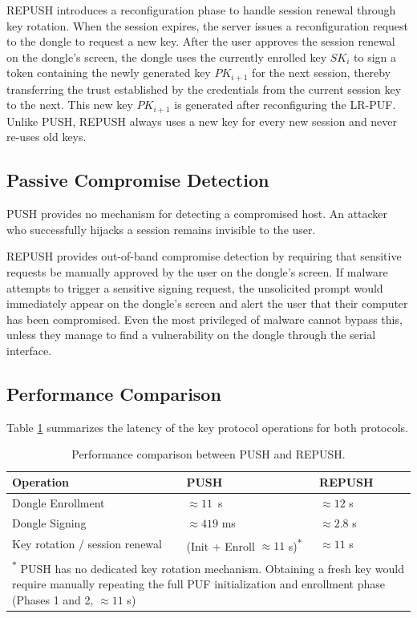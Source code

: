 REPUSH introduces a reconfiguration phase to handle session renewal through key rotation. When the session expires, the server issues a reconfiguration request to the dongle to request a new key. After the user approves the session renewal on the dongle's screen, the dongle uses the currently enrolled key $SK_i$ to sign a token containing the newly generated key $PK_{i+1}$ for the next session, thereby transferring the trust established by the credentials from the current session key to the next. This new key $PK_{i+1}$ is generated after reconfiguring the LR-PUF. Unlike PUSH, REPUSH always uses a new key for every new session and never re-uses old keys.


\subsection{Passive Compromise Detection}
PUSH provides no mechanism for detecting a compromised host. An attacker who successfully hijacks a session remains invisible to the user.

REPUSH provides out-of-band compromise detection by requiring that sensitive requests be manually approved by the user on the dongle's screen. If malware attempts to trigger a sensitive signing request, the unsolicited prompt would immediately appear on the dongle's screen and alert the user that their computer has been compromised. Even the most privileged of malware cannot bypass this, unless they manage to find a vulnerability on the dongle through the serial interface.

\subsection{Performance Comparison}

Table \ref{tab:perf-push-repush} summarizes the latency of the key protocol operations for both protocols.

\begin{table}[ht!]
\centering
\caption{Performance comparison between PUSH and REPUSH.}
\begin{tabular}{lll}
\hline
\textbf{Operation}                         & \textbf{PUSH}                     & \textbf{REPUSH} \\
\hline
Dongle Enrollment      & $\approx 11$\ s                   & $\approx 12$ s \\
Dongle Signing                     & $\approx 419$ ms                 & $\approx 2.8$ s \\
Key rotation / session renewal             & (Init + Enroll $\approx 11$ s)\textsuperscript{$*$}                     & $\approx 11$ s  \\
\hline
\multicolumn{3}{p{0.9\textwidth}}{\textsuperscript{$*$} PUSH has no dedicated key rotation mechanism. Obtaining a fresh key would require manually repeating the full PUF initialization and enrollment phase (Phases 1 and 2, $\approx 11$ s)}
\end{tabular}
\label{tab:perf-push-repush}
\end{table}

